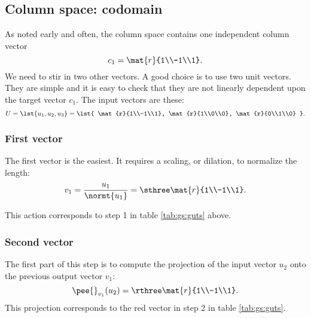 \subsection{Column space: codomain}
As noted early and often, the column space contains one independent column vector
\begin{equation}
  c_{1} = \mat{r}{1\\-1\\1}.
\end{equation}
We need to stir in two other vectors. A good choice is to use two unit vectors. They are simple and it is easy to check that they are not linearly dependent upon the target vector $c_{1}$. The input vectors are these:
\begin{equation}
  U = \lst{u_{1},u_{2},u_{3}} = \lst{
  \mat{r}{1\\-1\\1},
  \mat{r}{1\\0\\0},
  \mat{r}{0\\1\\0}
  }.
\end{equation}

\subsubsection{First vector}
The first vector is the easiest. It requires a scaling, or dilation, to normalize the length:
\begin{equation}
  v_{1} = \frac{u_{1}}{\normt{u_{1}}} = \sthree
  \mat{r}{1\\-1\\1}.
\end{equation}

This action corresponds to step 1 in table \eqref{tab:gs:guts} above.

\subsubsection{Second vector}
The first part of this step is to compute the projection of the input vector $u_{2}$ onto the previous output vector $v_{1}$:
\begin{equation}
  \pee{}_{v_{1}}(u_{2}) = \rthree\mat{r}{1\\-1\\1}.
\end{equation}
This projection corresponds to the red vector in step 2 in table \eqref{tab:gs:guts}.

